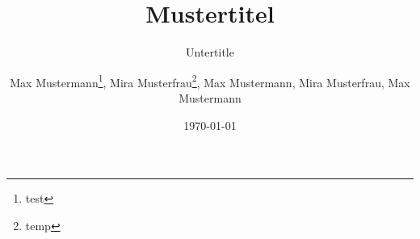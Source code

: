 \author{
	Max Mustermann\thanks{test},
	Mira Musterfrau\thanks{temp},
	Max Mustermann,
	Mira Musterfrau,
	Max Mustermann
}
\titlehead{Fachbereich}
\subject{Grund der Arbeit}
\title{Mustertitel}
\subtitle{Untertitle}
\date{\today}
\publishers{HERAUSGEBER}
